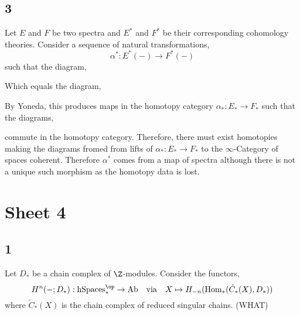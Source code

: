 \documentclass[12pt]{extarticle}
\begin{document}
\subsection*{3}

Let $E$ and $F$ be two spectra and $E^*$ and $F^*$ be their corresponding cohomology theories. Consider a sequence of natural transformations,
\[ \alpha^* : E^*(-) \to F^*(-) \]
such that the diagram,
\begin{center}
\end{center}
Which equals the diagram,
\begin{center}
\end{center}
By Yoneda, this produces maps in the homotopy category $\alpha_* : E_* \to F_*$ such that the diagrams,
\begin{center}
\end{center}
commute in the homotopy category. Therefore, there must exist homotopies making the diagrams fromed from lifts of $\alpha_* : E_* \to F_*$ to the $\infty$-Category of spaces coherent. Therefore $\alpha^*$ comes from a map of spectra although there is not a unique such morphism as the homotopy data is lost.


\section{Sheet 4}

\subsection*{1}

Let $D_*$ be a chain complex of $\Z$-modules. Consider the functors,
\[ H^n(-; D_*) : \mathrm{hSpaces}_*^\op \to \mathrm{Ab} \quad \text{via} \quad X \mapsto H_{-n}(\mathrm{Hom}_*(\tilde{C}_*(X), D_*)) \]
where $\tilde{C}_*(X)$ is the chain complex of reduced singular chains. (WHAT)
\end{document}
